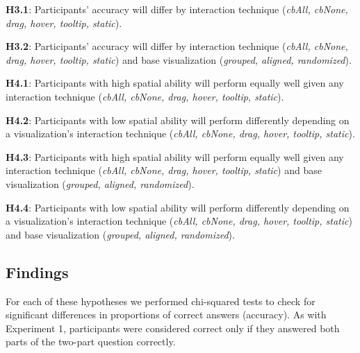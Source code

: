 \begin{compacthang} 
	\item \textbf{H3.1}: Participants' accuracy will differ by interaction technique (\textit{cbAll, cbNone, drag, hover, tooltip, static}). 
	\item \textbf{H3.2}: Participants' accuracy will differ by interaction technique (\textit{cbAll, cbNone, drag, hover, tooltip, static}) and base visualization (\textit{grouped, aligned, randomized}).  
	\item \textbf{H4.1}: Participants with high spatial ability will perform equally well given any interaction technique (\textit{cbAll, cbNone, drag, hover, tooltip, static}). 
	\item \textbf{H4.2}: Participants with low spatial ability will perform differently depending on a visualization's interaction technique (\textit{cbAll, cbNone, drag, hover, tooltip, static}).
	\item \textbf{H4.3}: Participants with high spatial ability will perform equally well given any interaction technique (\textit{cbAll, cbNone, drag, hover, tooltip, static}) and base visualization (\textit{grouped, aligned, randomized}). 
	\item \textbf{H4.4}: Participants with low spatial ability will perform differently depending on a visualization's interaction technique (\textit{cbAll, cbNone, drag, hover, tooltip, static})  and base visualization (\textit{grouped, aligned, randomized}).
	
\end{compacthang}

\subsection{Findings}
For each of these hypotheses we performed chi-squared tests to check for significant differences in proportions of correct answers (accuracy). As with Experiment 1, participants were considered correct only if they answered both parts of the two-part question correctly. 

